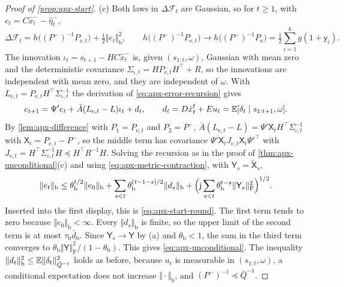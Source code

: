 \begin{proof}[Proof of \cref{prop:apx-start}]
(c) Both laws in $\Delta\mathcal F_t$ are Gaussian, so for $t\ge1$, with $e_t=C\hat x^-_t-\hat\eta^-_t$,
\begin{equation*}
\Delta\mathcal F_t=h\bigl((P^-)^{-1}P_{\mathrm e,t}\bigr)+\tfrac12\Vert e_t\Vert_{\mathrm b}^2,\qquad h\bigl((P^-)^{-1}P_{\mathrm e,t}\bigr)\to h\bigl((P^-)^{-1}P_{\mathrm e}\bigr)=\tfrac12\sum_{i=1}^kg(1+\mathsf y_i) .
\end{equation*}
The innovation $\iota_t=s_{t+1}-HC\hat x^-_t$ is, given $(s_{1:t},\omega)$, Gaussian with mean zero and the deterministic covariance $\Sigma_{\iota,t}=HP_{\mathrm e,t}H^\top+R$, so the innovations are independent with mean zero, and they are independent of $\omega$. With $L_{\mathrm e,t}=P_{\mathrm e,t}H^\top\Sigma_{\iota,t}^{-1}$ the derivation of \cref{eq:apx-error-recursion} gives
\begin{equation*}
e_{t+1}=\Psi'e_t+\bar A(L_{\mathrm e,t}-L)\iota_t+d_t,\qquad d_t=D\hat x^{\mathrm f}_t+Eu_t=\mathbb{E}[\delta_t\mid s_{1:t+1},\omega] .
\end{equation*}
By \cref{lem:apx-difference} with $P_1=P_{\mathrm e,t}$ and $P_2=P^-$, $\bar A(L_{\mathrm e,t}-L)=\Psi'\mathsf X_tH^\top\Sigma_{\iota,t}^{-1}$ with $\mathsf X_t=P_{\mathrm e,t}-P^-$, so the middle term has covariance $\Psi'\mathsf X_tJ_{\mathrm e,t}\mathsf X_t\Psi'^\top$ with $J_{\mathrm e,t}=H^\top\Sigma_{\iota,t}^{-1}H\preceq H^\top R^{-1}H$. Solving the recursion as in the proof of \cref{thm:apx-unconditional}(c) and using \cref{eq:apx-metric-contraction}, with $\mathsf Y_s=\tilde{\mathsf X}_s$,
\begin{equation*}
\Vert e_t\Vert_{\mathrm b}\le\theta_{\mathrm b}^{t/2}\Vert e_0\Vert_{\mathrm b}+\sum_{s<t}\theta_{\mathrm b}^{(t-1-s)/2}\Vert d_s\Vert_{\mathrm b}+\Bigl(\mathsf j\sum_{s<t}\theta_{\mathrm b}^{t-s}\Vert\mathsf Y_s\Vert_{\mathrm F}^2\Bigr)^{1/2} .
\end{equation*}
Inserted into the first display, this is \cref{eq:apx-start-round}. The first term tends to zero because $\Vert e_0\Vert_{\mathrm b}<\infty$. Every $\Vert d_s\Vert_{\mathrm b}$ is finite, so the upper limit of the second term is at most $\tau_{\mathrm b}\bar d_{\mathrm b}$. Since $\mathsf Y_s\to\mathsf Y$ by (a) and $\theta_{\mathrm b}<1$, the sum in the third term converges to $\theta_{\mathrm b}\Vert\mathsf Y\Vert_{\mathrm F}^2/(1-\theta_{\mathrm b})$. This gives \cref{eq:apx-unconditional}. The inequality $\Vert d_t\Vert_{\mathrm b}^2\le\mathbb{E}\Vert\delta_t\Vert^2_{\bar Q^{-1}}$ holds as before, because $u_t$ is measurable in $(s_{1:t},\omega)$, a conditional expectation does not increase $\Vert\cdot\Vert_{\mathrm b}$, and $(P^-)^{-1}\preceq\bar Q^{-1}$.
\end{proof}


